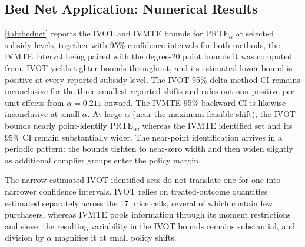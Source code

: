 \subsection{Bed Net Application: Numerical Results}

\cref{tab:bednet} reports the IVOT and IVMTE bounds for $\text{PRTE}_\alpha$ at selected subsidy levels, together with 95\% confidence intervals for both methods, the IVMTE interval being paired with the degree-$20$ point bounds it was computed from. IVOT yields tighter bounds throughout, and its estimated lower bound is positive at every reported subsidy level. The IVOT 95\% delta-method CI remains inconclusive for the three smallest reported shifts and rules out non-positive per-unit effects from $\alpha=0.211$ onward. The IVMTE 95\% backward CI is likewise inconclusive at small $\alpha$. At large $\alpha$ (near the maximum feasible shift), the IVOT bounds nearly point-identify $\text{PRTE}_\alpha$, whereas the IVMTE identified set and its 95\% CI remain substantially wider. The near-point identification arrives in a periodic pattern: the bounds tighten to near-zero width and then widen slightly as additional complier groups enter the policy margin.

The narrow estimated IVOT identified sets do not translate one-for-one into narrower confidence intervals. IVOT relies on treated-outcome quantities estimated separately across the 17 price cells, several of which contain few purchasers, whereas IVMTE pools information through its moment restrictions and sieve; the resulting variability in the IVOT bounds remains substantial, and division by $\alpha$ magnifies it at small policy shifts. 

